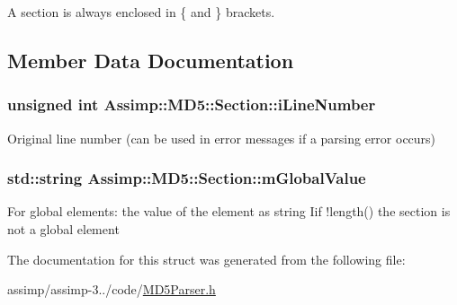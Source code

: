 A section is always enclosed in \{ and \} brackets. 

\subsection{Member Data Documentation}
\hypertarget{struct_assimp_1_1_m_d5_1_1_section_ad5d93fa3f16dc026086217c0352304cf}{
\subsubsection[{i\+Line\+Number}]{\setlength{\rightskip}{0pt plus 5cm}unsigned int Assimp\+::\+M\+D5\+::\+Section\+::i\+Line\+Number}}\label{struct_assimp_1_1_m_d5_1_1_section_ad5d93fa3f16dc026086217c0352304cf}
Original line number (can be used in error messages if a parsing error occurs) \hypertarget{struct_assimp_1_1_m_d5_1_1_section_ae8c58e6f7a377cd0c8f079d6262c71ef}{
\subsubsection[{m\+Global\+Value}]{\setlength{\rightskip}{0pt plus 5cm}std\+::string Assimp\+::\+M\+D5\+::\+Section\+::m\+Global\+Value}}\label{struct_assimp_1_1_m_d5_1_1_section_ae8c58e6f7a377cd0c8f079d6262c71ef}
For global elements\+: the value of the element as string Iif !length() the section is not a global element 

The documentation for this struct was generated from the following file\+:\begin{DoxyCompactItemize}
\item 
assimp/assimp-\/3../code/\hyperlink{_m_d5_parser_8h}{M\+D5\+Parser.\+h}\end{DoxyCompactItemize}
